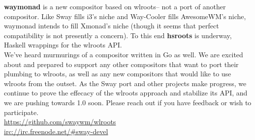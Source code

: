 \documentclass{article}
\begin{document}
\textbf{waymonad} is a new compositor based on wlroots-- not a port of another
compositor. Like Sway fills i3's niche and Way-Cooler fills AwesomeWM's niche,
waymonad intends to fill Xmonad's niche (though it seems that perfect
compatibility is not presently a concern). To this end \textbf{hsroots} is
underway, Haskell wrappings for the wlroots API.\\

We've heard murmurings of a compositor written in Go as well. We are excited
about and prepared to support any other compositors that want to port their
plumbing to wlroots, as well as any new compositors that would like to use
wlroots from the outset. As the Sway port and other projects make progress, we
continue to prove the effecacy of the wlroots approach and stabilize its API,
and we are pushing towards 1.0 soon. Please reach out if you have feedback or
wish to participate.\\

\url{https://github.com/swaywm/wlroots}\\

\url{irc://irc.freenode.net/#sway-devel}
\end{document}
